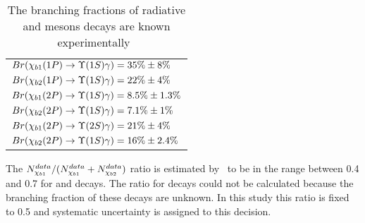 \begin{table}[H]
\caption{The branching fractions of radiative \chibOneP and \chibTwoP mesons
decays are known experimentally~\cite{PDG2012}}
\centering
\begin{tabular}{l}
$Br(\chiboneOneP \to \Y1S \gamma) = 35\% \pm 8\%$ \\
$Br(\chibtwoOneP \to \Y1S \gamma) = 22\% \pm 4\%$ \\
$Br(\chiboneTwoP \to \Y1S \gamma) = 8.5\% \pm 1.3\%$ \\
$Br(\chibtwoTwoP \to \Y1S \gamma)  = 7.1\% \pm 1\%$ \\
$Br(\chiboneTwoP \to \Y2S \gamma) = 21\% \pm 4\%$ \\
$Br(\chibtwoTwoP \to \Y1S \gamma) = 16\% \pm 2.4\%$ \\
\end{tabular}
\label{tab:branching}
\end{table}

The $N_{\chi_{b 1}}^{data}/(N_{\chi_{b 1}}^{data} + N_{\chi_{b 2}}^{data})$ ratio is
estimated by~ to be in the range between 0.4 and 0.7 for
\chibOneP and \chibTwoP decays. The ratio for \chibThreeP decays could not be
calculated because the branching fraction of these decays are unknown. In this
study this ratio is fixed to 0.5 and systematic uncertainty is assigned to this
decision.


% 

